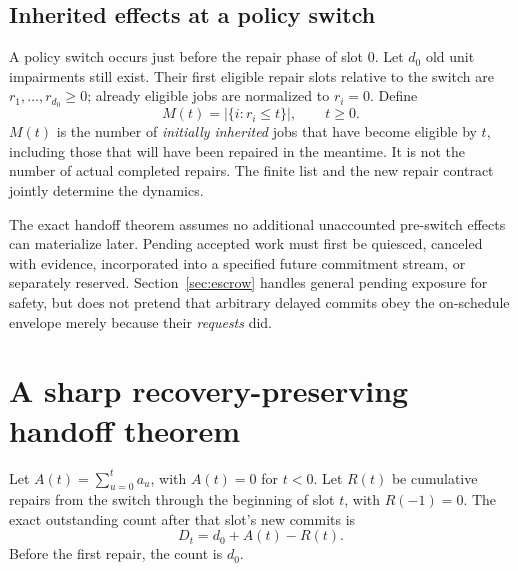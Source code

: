 \subsection{Inherited effects at a policy switch}
A policy switch occurs just before the repair phase of slot 0. Let $d_0$ old unit impairments still exist. Their first eligible repair slots relative to the switch are $r_1,\ldots,r_{d_0}\ge0$; already eligible jobs are normalized to $r_i=0$. Define
\begin{equation}
M(t)=\big|\{i:r_i\le t\}\big|,\qquad t\ge0.
\label{eq:maturity}
\end{equation}
$M(t)$ is the number of \emph{initially inherited} jobs that have become eligible by $t$, including those that will have been repaired in the meantime. It is not the number of actual completed repairs. The finite list and the new repair contract jointly determine the dynamics.

The exact handoff theorem assumes no additional unaccounted pre-switch effects can materialize later. Pending accepted work must first be quiesced, canceled with evidence, incorporated into a specified future commitment stream, or separately reserved. Section~\ref{sec:escrow} handles general pending exposure for safety, but does not pretend that arbitrary delayed commits obey the on-schedule envelope merely because their \emph{requests} did.

\section{A sharp recovery-preserving handoff theorem}
\label{sec:handoff}
Let $A(t)=\sum_{u=0}^{t}a_u$, with $A(t)=0$ for $t<0$. Let $R(t)$ be cumulative repairs from the switch through the beginning of slot $t$, with $R(-1)=0$. The exact outstanding count after that slot's new commits is
\begin{equation}
D_t=d_0+A(t)-R(t).
\end{equation}
Before the first repair, the count is $d_0$.


